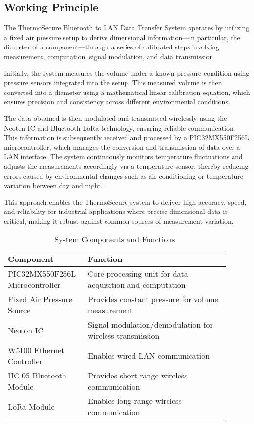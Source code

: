 \documentclass[12pt]{report}
\begin{document}
\usepackage{ragged2e} %


\subsection{Working Principle}
\begin{justify}
The ThermoSecure Bluetooth to LAN Data Transfer System operates by utilizing a fixed air pressure setup to derive dimensional information—in particular, the diameter of a component—through a series of calibrated steps involving measurement, computation, signal modulation, and data transmission.

Initially, the system measures the volume under a known pressure condition using pressure sensors integrated into the setup. This measured volume is then converted into a diameter using a mathematical linear calibration equation, which ensures precision and consistency across different environmental conditions.

The data obtained is then modulated and transmitted wirelessly using the Neoton IC and Bluetooth LoRa technology, ensuring reliable communication. This information is subsequently received and processed by a PIC32MX550F256L microcontroller, which manages the conversion and transmission of data over a LAN interface. The system continuously monitors temperature fluctuations and adjusts the measurements accordingly via a temperature sensor, thereby reducing errors caused by environmental changes such as air conditioning or temperature variation between day and night.

This approach enables the ThermoSecure system to deliver high accuracy, speed, and reliability for industrial applications where precise dimensional data is critical, making it robust against common sources of measurement variation.
\end{justify}

\begin{table}[H]
\centering
\caption{System Components and Functions}
\label{tab:components}
\begin{tabular}{|p{0.3\linewidth}|p{0.6\linewidth}|}
\hline
\textbf{Component} & \textbf{Function} \\ \hline
PIC32MX550F256L Microcontroller & Core processing unit for data acquisition and computation \\ \hline
Fixed Air Pressure Source & Provides constant pressure for volume measurement \\ \hline
Neoton IC & Signal modulation/demodulation for wireless transmission \\ \hline
W5100 Ethernet Controller & Enables wired LAN communication \\ \hline
HC-05 Bluetooth Module & Provides short-range wireless communication \\ \hline
LoRa Module & Enables long-range wireless communication \\ \hline
\end{tabular}
\end{table}
\end{document}
